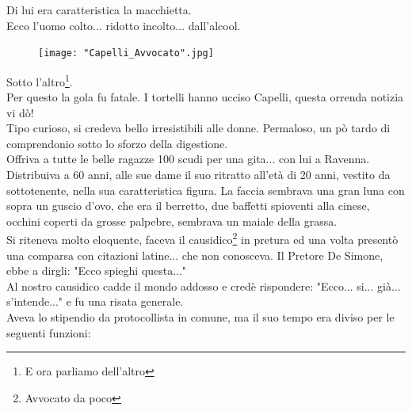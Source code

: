 \documentclass[10pt]{memoir} %
\begin{document}
\normalfont \normalsize
Di lui era caratteristica la macchietta.\\
Ecco l'uomo colto... ridotto incolto... dall'alcool.
\begin{figure}[H]
\begin{center}
\vspace{-4pt}
   \texttt{[image: "Capelli\_Avvocato".jpg]}\\
  \end{center}
  \vspace{-102pt}
\end{figure}
\newpage
{}Sotto l'altro\footnote{E ora parliamo dell'altro}. \\Per questo la gola fu fatale. I tortelli hanno ucciso Capelli, questa orrenda notizia vi dò!\\
Tipo curioso, si credeva bello irresistibili alle donne. Permaloso, un pò tardo di comprendonio sotto lo sforzo della digestione.\\
Offriva a tutte le belle ragazze 100 scudi per una gita... con lui a Ravenna. Distribuiva a 60 anni, alle sue dame il suo ritratto all'età di 20 anni, vestito da sottotenente, nella sua caratteristica figura. La faccia sembrava una gran luna con sopra un guscio d'ovo, che era il berretto, due baffetti spioventi alla cinese, occhini coperti da grosse palpebre, sembrava un maiale della grassa. \\
Si riteneva molto eloquente, faceva il causidico\footnote{Avvocato da poco} in pretura ed una volta presentò una comparsa con citazioni latine... che non conosceva. Il Pretore De Simone, ebbe a dirgli: "Ecco spieghi questa..."\\
Al nostro causidico cadde il mondo addosso e credè rispondere: "Ecco... si... già... s'intende..." e fu una risata generale.\\
Aveva lo stipendio da protocollista in comune, ma il suo tempo era diviso per le seguenti funzioni:\\
\end{document}
